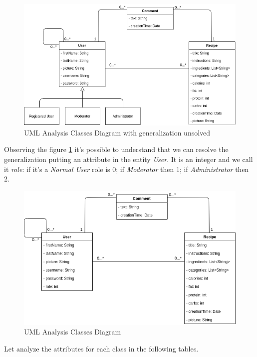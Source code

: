 \documentclass[a4paper]{report}
\begin{document}
\begin{figure}[htpb]
	\centering
	\includegraphics[scale=0.5]{img/ClassDiagram_generaliz.png}
	\caption{UML Analysis Classes Diagram with generalization unsolved}
	\label {img: UML1}
\end{figure}

\noindent Observing the figure \ref{img: UML1} it's possible to understand that we can resolve the generalization putting an attribute in the entity \emph{User}. It is an integer and we call it \emph{role}: if it's a \emph{Normal User} role is 0; if \emph{Moderator} then 1; if \emph{Administrator} then 2.

\begin{figure}[htpb]
	\centering
	\includegraphics[scale=0.5]{img/ClassDiagram.png}
	\caption{UML Analysis Classes Diagram}
\end{figure}

Let analyze the attributes for each class in the following tables.
\end{document}
